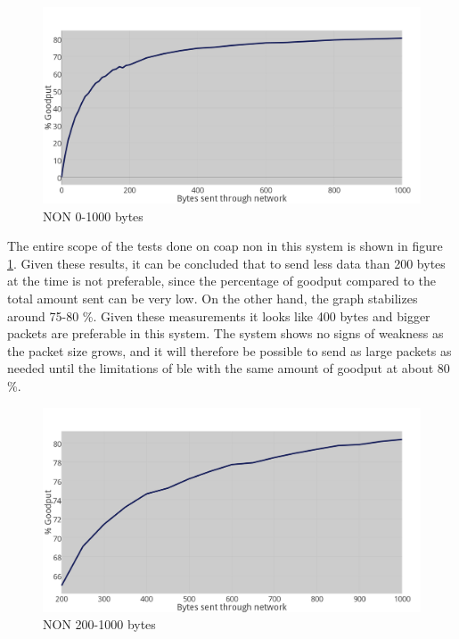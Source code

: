 \begin{figure}[ht]
    \centering
    \includegraphics[scale=1.0]{NON_0toKplotx09_thickerLineGRAY.png}    
    \caption{NON 0-1000 bytes}
    \label{fig:NON0-kb}
\end{figure}

\noindent The entire scope of the tests done on \gls{coap} \gls{non} in this system is shown in figure \ref{fig:NON0-kb}. Given these results, it can be concluded that to send less data than 200 bytes at the time is not preferable, since the percentage of goodput compared to the total amount sent can be very low. On the other hand, the graph stabilizes around 75-80 \%. Given these measurements it looks like 400 bytes and bigger packets are preferable in this system. The system shows no signs of weakness as the packet size grows, and it will therefore be possible to send as large packets as needed until the limitations of \gls{ble} with the same amount of goodput at about 80 \%. 

\begin{figure}[ht]
    \centering
    \includegraphics[scale=1.0]{NON_200toKplotx09_thickerLineGRAY.png}    
    \caption{NON 200-1000 bytes}
    \label{fig:NON200-kb}
\end{figure}


